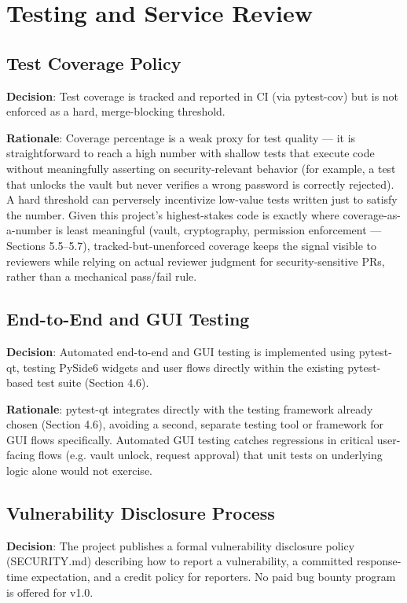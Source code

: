 \chapter{Testing and Service Review}

\section{Test Coverage Policy}
\textbf{Decision}: Test coverage is tracked and reported in CI (via pytest-cov) but is not enforced as a hard, merge-blocking threshold.

\textbf{Rationale}: Coverage percentage is a weak proxy for test quality — it is straightforward to reach a high number with shallow tests that execute code without meaningfully asserting on security-relevant behavior (for example, a test that unlocks the vault but never verifies a wrong password is correctly rejected). A hard threshold can perversely incentivize low-value tests written just to satisfy the number. Given this project's highest-stakes code is exactly where coverage-as-a-number is least meaningful (vault, cryptography, permission enforcement — Sections 5.5–5.7), tracked-but-unenforced coverage keeps the signal visible to reviewers while relying on actual reviewer judgment for security-sensitive PRs, rather than a mechanical pass/fail rule.
\section{End-to-End and GUI Testing}
\textbf{Decision}: Automated end-to-end and GUI testing is implemented using pytest-qt, testing PySide6 widgets and user flows directly within the existing pytest-based test suite (Section 4.6).

\textbf{Rationale}: pytest-qt integrates directly with the testing framework already chosen (Section 4.6), avoiding a second, separate testing tool or framework for GUI flows specifically. Automated GUI testing catches regressions in critical user-facing flows (e.g. vault unlock, request approval) that unit tests on underlying logic alone would not exercise.
\section{Vulnerability Disclosure Process}
\textbf{Decision}: The project publishes a formal vulnerability disclosure policy (SECURITY.md) describing how to report a vulnerability, a committed response-time expectation, and a credit policy for reporters. No paid bug bounty program is offered for v1.0.


